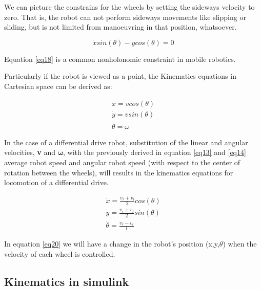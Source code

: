 We can picture the constrains for the wheels by setting the sideways velocity to zero. That is, the robot can not perform sideways movements like slipping or sliding, but is not limited from manoeuvring in that position, whatsoever. 

\begin{equation} \label{eq18}
\dot{x}sin(\theta) - \dot{y}cos(\theta) = 0
\end{equation}

Equation \ref{eq18} is a common nonholonomic constraint in mobile robotics. 

Particularly if the robot is viewed as a point, the Kinematics equations in Cartesian space can be derived as:

\begin{align}
\dot{x} = vcos(\theta) \nonumber \\
\dot{y} = vsin(\theta) \label{eq19} \\
\dot{\theta} = \omega  \nonumber 
\end{align}

In the case of a differential drive robot, substitution of the linear and angular velocities, \textbf{v} and $\boldsymbol{\omega}$, with the previously derived in equation \ref{eq13} and \ref{eq14} average robot speed and angular robot speed (with respect to the center of rotation between the wheels), will results in the kinematics equations for locomotion of a differential drive. 

\begin{align}
\dot{x} = \frac{v_r + v_l}{2}cos(\theta) \nonumber \\
\dot{y} = \frac{v_r + v_l}{2}sin(\theta) \label{eq20} \\
\dot{\theta} = \frac{v_r - v_l}{l} \nonumber
\end{align}

In equation \ref{eq20} we will have a change in the robot's position (x,y,$\theta$) when the velocity of each wheel is controlled. 

\subsection{Kinematics in simulink} 

